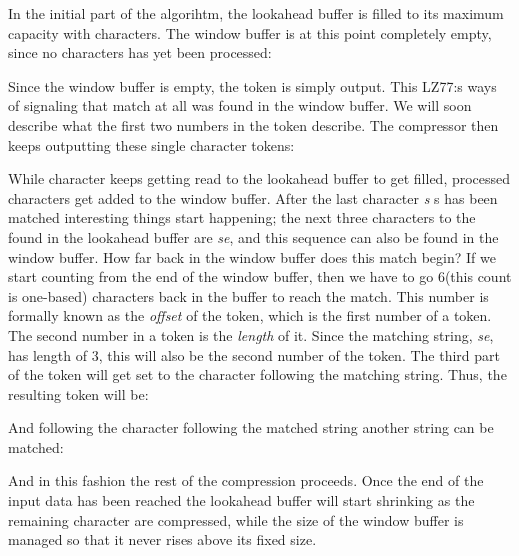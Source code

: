 In the initial part of the algorihtm, the lookahead buffer is filled
to its maximum capacity with characters. The window buffer is at this
point completely empty, since no characters has yet been processed:

\newcommand{\windowsize}{20}
\newcommand{\lookaheadsize}{10}


Since the window buffer is empty, the token  is simply
output. This LZ77:s ways of signaling that match at all was found in
the window buffer. We will soon describe what the first two numbers in
the token describe. The compressor then keeps outputting these single
character tokens:


While character keeps getting read to the lookahead buffer to get
filled, processed characters get added to the window buffer. After the
last character \textit{s} s has been matched interesting things start
happening; the next three characters to the found in the lookahead
buffer are \textit{{\spc{}se}}, and this sequence can also be found in
the window buffer. How far back in the window buffer does this match
begin? If we start counting from the end of the window buffer, then we
have to go $6$(this count is one-based) characters back in the buffer
to reach the match. This number is formally known as the
\textit{offset} of the token, which is the first number of a
token. The second number in a token is the \textit{length} of
it. Since the matching string, \textit{{\spc{}se}}, has length of $3$,
this will also be the second number of the token. The third part of
the token will get set to the character following the matching
string. Thus, the resulting token will be:


And following the character following the matched string another
string can be matched:


And in this fashion the rest of the compression proceeds. Once the end
of the input data has been reached the lookahead buffer will start
shrinking as the remaining character are compressed, while the size of
the window buffer is managed so that it never rises above its fixed
size.

